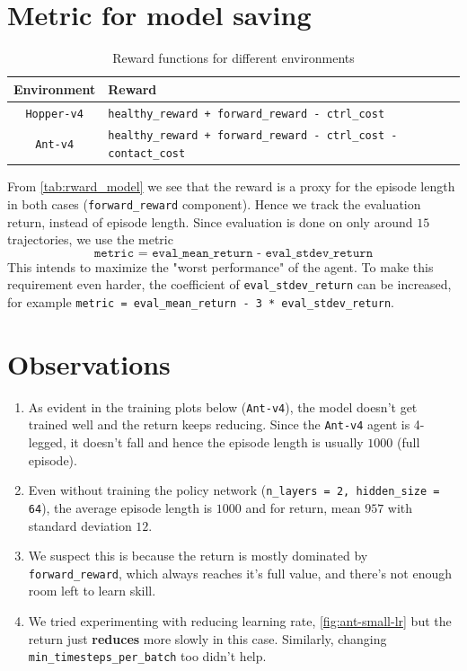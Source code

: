 \section{Metric for model saving}\label{sec:metric}
\begin{table}[H]
\centering
\begin{tabular}{cl}
\hline
\textbf{Environment} & \textbf{Reward} \\
\hline
\texttt{Hopper-v4} & \texttt{healthy\_reward + forward\_reward - ctrl\_cost} \\
\texttt{Ant-v4} & \texttt{healthy\_reward + forward\_reward - ctrl\_cost - contact\_cost} \\
\hline
\end{tabular}
\caption{Reward functions for different environments}
\label{tab:rward_model}
\end{table}
From \autoref{tab:rward_model} we see that the reward is a proxy for the episode length in both cases (\texttt{forward\_reward} component). Hence we track the evaluation return, instead of episode length. Since evaluation is done on only around $15$ trajectories, we use the metric
\begin{equation*}
    \texttt{metric = eval\_mean\_return - eval\_stdev\_return}
\end{equation*}
This intends to maximize the "worst performance" of the agent. To make this requirement even harder, the coefficient of \texttt{eval\_stdev\_return} can be increased, for example   \texttt{metric = eval\_mean\_return - 3 * eval\_stdev\_return}.


\section{Observations}
\begin{enumerate}
\item As evident in the training plots below (\texttt{Ant-v4}), the model doesn't get trained well and the return keeps reducing.
Since the \texttt{Ant-v4} agent is 4-legged, it doesn't fall and hence the episode length is usually $1000$ (full episode). \item Even without training the policy network (\texttt{n\_layers = 2, hidden\_size = 64}), the average episode length is $1000$ and for return, mean $957$ with standard deviation $12$.
\item We suspect this is because the return is mostly dominated by \texttt{forward\_reward}, which always reaches it's full value, and there's not enough room left to learn skill. 

\item We tried experimenting with reducing learning rate, \autoref{fig:ant-small-lr} but the return just \textbf{reduces} more slowly in this case. Similarly, changing \texttt{min\_timesteps\_per\_batch} too didn't help.
\end{enumerate}


